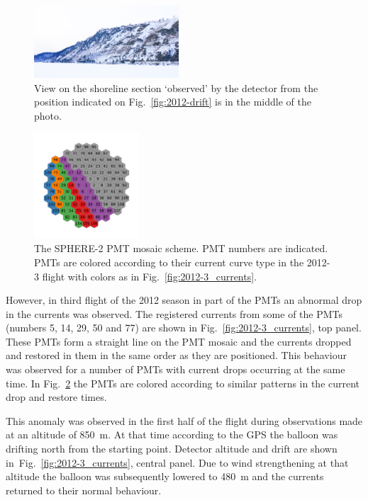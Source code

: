\documentclass[universe,article,submit,moreauthors,pdftex]{Definitions/mdpi}
\begin{document}
\begin{figure}[tb]
    \includegraphics[width=0.48\textwidth]{DSC_7256_1.jpg}
    \caption{View on the shoreline section `observed' by the detector from the position indicated on Fig.~\ref{fig:2012-drift} is in the middle of the photo.}
    \label{fig:2012--shore-view}
\end{figure}
\begin{figure}[tb]
\centering
    \includegraphics[width=0.35\textwidth]{2012-3_retina_all.pdf}
    \caption{The SPHERE-2 PMT mosaic scheme. PMT numbers are indicated. PMTs are colored according to their current curve type in the 2012-3 flight with colors as in Fig.~\ref{fig:2012-3_currents}.}
    \label{fig:2012-3_shore_image}
\end{figure}

However, in third flight of the 2012 season in part of the PMTs an abnormal drop in the currents was observed.
The registered currents from some of the PMTs (numbers 5, 14, 29, 50 and 77) are shown in Fig.~\ref{fig:2012-3_currents}, top panel. These PMTs form a straight line on the PMT mosaic and the currents dropped and restored in them in the same order as they are positioned. This behaviour was observed for a number of PMTs with current drops occurring at the same time. In Fig.~\ref{fig:2012-3_shore_image} the PMTs are colored according to similar patterns in the current drop and restore times.

This anomaly was observed in the first half of the flight during observations made at an altitude of 850~m. At that time according to the GPS the balloon was drifting north from the starting point. Detector altitude and drift are shown in~Fig.~\ref{fig:2012-3_currents}, central panel. Due to wind strengthening at that altitude the balloon was subsequently lowered to 480~m and the currents returned to their normal behaviour. 
\end{document}
